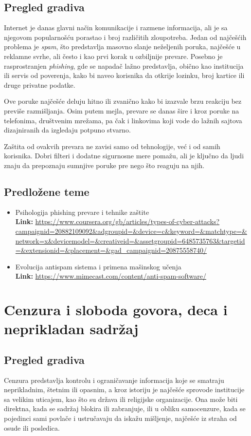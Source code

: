 \documentclass[a4paper,12pt]{article}
\begin{document}
\subsection{Pregled gradiva}
Internet je danas glavni način komunikacije i razmene informacija, ali je sa njegovom popularnošću porastao i broj različitih zloupotreba. Jedan od najčešćih problema je \emph{spam}, što predstavlja masovno slanje neželjenih poruka, najčešće u reklamne svrhe, ali često i kao prvi korak u ozbiljnije prevare. Posebno je rasprostranjen \emph{phishing}, gde se napadač lažno predstavlja, obično kao institucija ili servis od poverenja, kako bi naveo korisnika da otkrije lozinku, broj kartice ili druge privatne podatke.

Ove poruke najčešće deluju hitno ili zvanično kako bi izazvale brzu reakciju bez previše razmišljanja. Osim putem mejla, prevare se danas šire i kroz poruke na telefonima, društvenim mrežama, pa čak i linkovima koji vode do lažnih sajtova dizajniranih da izgledaju potpuno stvarno.

Zaštita od ovakvih prevara ne zavisi samo od tehnologije, već i od samih korisnika. Dobri filteri i dodatne sigurnosne mere pomažu, ali je ključno da ljudi znaju da prepoznaju sumnjive poruke pre nego što reaguju na njih.


\subsection{Predložene teme}
\begin{itemize}
  \item Psihologija phishing prevare i tehnike zaštite \\
  \textbf{Link:} \url{https://www.coursera.org/gb/articles/types-of-cyber-attacks?campaignid=20882109092&adgroupid=&device=c&keyword=&matchtype=&network=x&devicemodel=&creativeid=&assetgroupid=6485735763&targetid=&extensionid=&placement=&gad_campaignid=20875558740/}
  \item Evolucija antispam sistema i primena mašinskog učenja \\
  \textbf{Link:} \url{https://www.mimecast.com/content/anti-spam-software/}
\end{itemize}

\section{Cenzura i sloboda govora, deca i neprikladan sadržaj}
\subsection{Pregled gradiva}
Cenzura predstavlja kontrolu i ograničavanje informacija koje se smatraju neprikladnim, štetnim ili opasnim, a kroz istoriju je najčešće sprovode institucije sa velikim uticajem, kao što su država ili religijske organizacije. Ona može biti direktna, kada se sadržaj blokira ili zabranjuje, ili u obliku samocenzure, kada se pojedinci sami povlače i ustručavaju da iskažu mišljenje, najčešće iz straha od osude ili posledica.
\end{document}
